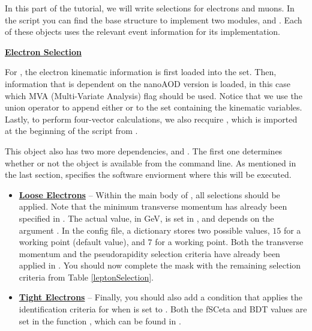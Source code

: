 In this part of the tutorial, we will write selections for electrons and muons.
In the script  you can find the base structure to implement two  modules,  and .
Each of these objects uses the relevant event information for its implementation.


\textbf{\underline{Electron Selection}}

For , the electron kinematic information is first loaded into the  set.
Then, information that is dependent on the nanoAOD version is loaded, in this case which MVA (Multi-Variate Analysis) flag should be used.
Notice that we use the union operator \code{|} to append either  or  to the set containing the kinematic variables.
Lastly, to perform four-vector calculations, we also recquire , which is imported at the beginning of the script from .


This  object also has two more dependencies,  and .
The first one determines whether or not the  object is available from the command line.
As mentioned in the last section,  specifies the software enviorment where this  will be executed.

\newpage
\begin{itemize}
    \item {
        \textbf{\underline{Loose Electrons}} -- Within the main body of , all selections should be applied.
        Note that the minimum transverse momentum has already been specified in .
        The actual value, in GeV, is set in , and depends on the argument .
        In the config file, a dictionary stores two possible values, $15$ for a  working point (default value), and $7$ for a  working point.
        Both the transverse momentum and the pseudorapidity selection criteria have already been applied in .
        You should now complete the mask with the remaining selection criteria from Table \ref{leptonSelection}.
    }
    \item {
        \textbf{\underline{Tight Electrons}} -- Finally, you should also add a condition that applies the identification criteria for when  is set to .
        Both the fSCeta and BDT values are set in the function , which can be found in .
    }
\end{itemize}

